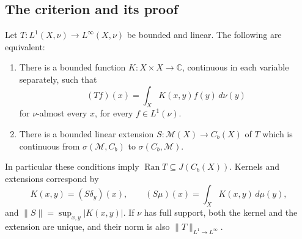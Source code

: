 \subsection{The criterion and its proof}
\begin{theorem}
\label{thm:separate_kernel_criterion}
Let $T:L^1(X,\nu)\to L^\infty(X,\nu)$ be bounded and linear.
The following are equivalent:
\begin{enumerate}
\item There is a bounded function $K:X\times X\to\mathbb C$,
continuous in each variable separately, such that
\[
(Tf)(x)=\int_X K(x,y)f(y)\,d\nu(y)
\]
for $\nu$-almost every $x$, for every $f\in L^1(\nu)$.
\item There is a bounded linear extension
$S:\mathcal M(X)\to C_b(X)$ of $T$ which is continuous from
$\sigma(\mathcal M,C_b)$ to $\sigma(C_b,\mathcal M)$.
\end{enumerate}
In particular these conditions imply $\operatorname{Ran}T\subseteq
J(C_b(X))$. Kernels and extensions correspond by
\[
K(x,y)=(S\delta_y)(x),\qquad
(S\mu)(x)=\int_X K(x,y)\,d\mu(y),
\]
and $\|S\|=\sup_{x,y}|K(x,y)|$.
If $\nu$ has full support, both the kernel and the extension are
unique, and their norm is also $\|T\|_{L^1\to L^\infty}$.
\end{theorem}
